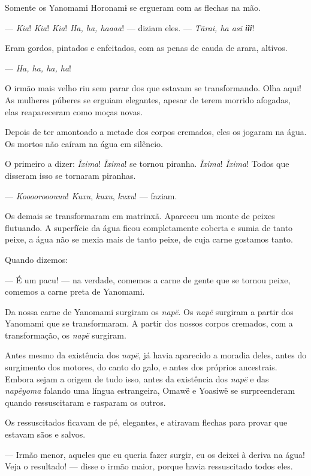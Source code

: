 Somente os Yanomami Horonamɨ se ergueram com as flechas na mão. 

--- \textit{Kia}! \textit{Kia}! \textit{Kia}! \textit{Ha, ha, haaaa}! --- diziam eles. --- \textit{Tãrai, ha asi
ɨ̃ɨɨ}! 

Eram gordos, pintados e enfeitados, com as penas de cauda de arara,
altivos.

--- \textit{Ha, ha, ha, ha}! 

O irmão mais velho riu sem parar dos que estavam se transformando. Olha
aqui! As mulheres púberes se erguiam elegantes, apesar de terem morrido
afogadas, elas reapareceram como moças novas. 

Depois de ter amontoado a metade dos corpos cremados, eles os jogaram na
água. Os mortos não caíram na água em silêncio. 

O primeiro a dizer: \textit{Ĩxima}! \textit{Ĩxima}! se tornou piranha. \textit{Ĩxima}! \textit{Ĩxima}! Todos
que disseram isso se tornaram piranhas. 

--- \textit{Koooorooouuu}! \textit{Kuxu}, \textit{kuxu}, \textit{kuxu}! --- faziam. 

Os demais se transformaram em matrinxã. Apareceu um monte de peixes
flutuando. A superfície da água ficou completamente coberta e sumia de
tanto peixe, a água não se mexia mais de tanto peixe, de cuja carne gostamos
tanto.

Quando dizemos:

--- É um pacu! --- na verdade, comemos a carne de gente que se tornou
peixe, comemos a carne preta de Yanomami. 

Da nossa carne de Yanomami surgiram os \textit{napë}. Os \textit{napë} surgiram a partir dos Yanomami que se transformaram. A partir dos nossos corpos cremados, com a transformação, os \textit{napë} surgiram. 

Antes mesmo da existência dos \textit{napë}, já havia aparecido a moradia
deles, antes do surgimento dos motores, do canto do galo, e antes dos
próprios ancestrais. Embora sejam a origem de tudo isso, antes da
existência dos \textit{napë} e das \textit{napëyoma} falando uma língua
estrangeira, Omawë e Yoasiwë se surpreenderam quando ressuscitaram e
rasparam os outros. 

Os ressuscitados ficavam de pé, elegantes, e atiravam flechas para
provar que estavam sãos e salvos.

--- Irmão menor, aqueles que eu queria fazer surgir, eu os
deixei à deriva na água! Veja o resultado! --- disse o irmão maior,
porque havia ressuscitado todos eles. 

